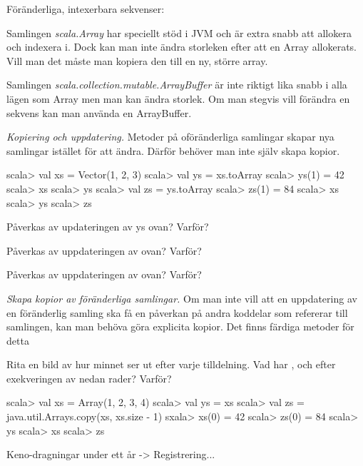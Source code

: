 

\Exercise{\ExeWeekFIVE}

\begin{Goals}
\item 
\end{Goals}

\begin{Preparations}
\item 
\end{Preparations}

\BasicTasks %

\Task Föränderliga, intexerbara sekvenser:

\Subtask Samlingen \emph{scala.Array} har speciellt stöd i JVM och är extra snabb att allokera och indexera i. Dock kan man inte ändra storleken efter att en Array allokerats. Vill man det måste man kopiera den till en ny, större array.

\Subtask Samlingen \emph{scala.collection.mutable.ArrayBuffer} är inte riktigt lika snabb i alla lägen som Array men man kan ändra storlek. Om man stegvis vill förändra en sekvens kan man använda en ArrayBuffer.

\Task \emph{Kopiering och uppdatering.} Metoder på oföränderliga samlingar skapar nya samlingar istället för att ändra. Därför behöver man inte själv skapa kopior.

\begin{REPL}
scala> val xs = Vector(1, 2, 3)
scala> val ys = xs.toArray
scala> ys(1) = 42
scala> xs
scala> ys
scala> val zs = ys.toArray
scala> zs(1) = 84
scala> xs
scala> ys
scala> zs
\end{REPL}

\Subtask Påverkas  av updateringen av ys ovan? Varför?

\Subtask Påverkas  av uppdateringen av  ovan? Varför? 

\Subtask Påverkas  av uppdateringen av  ovan? Varför? 

\Task \emph{Skapa kopior av föränderliga samlingar.} Om man inte vill att en uppdatering av en föränderlig samling ska få en påverkan på andra koddelar som refererar till samlingen, kan man behöva göra explicita kopior. Det finns färdiga metoder för detta

\Subtask\Pen Rita en bild av hur minnet ser ut efter varje tilldelning. Vad har ,  och  efter exekveringen av nedan rader? Varför? 
\begin{REPL}
scala> val xs = Array(1, 2, 3, 4)
scala> val ys = xs
scala> val zs = java.util.Arrays.copy(xs, xs.size - 1)
sxala> xs(0) = 42
scala> zs(0) = 84
scala> ys
scala> xs
scala> zs
\end{REPL}







\Task Keno-dragningar under ett år -> Registrering...

\ExtraTasks %

\Task 

\AdvancedTasks %

\Task     
    